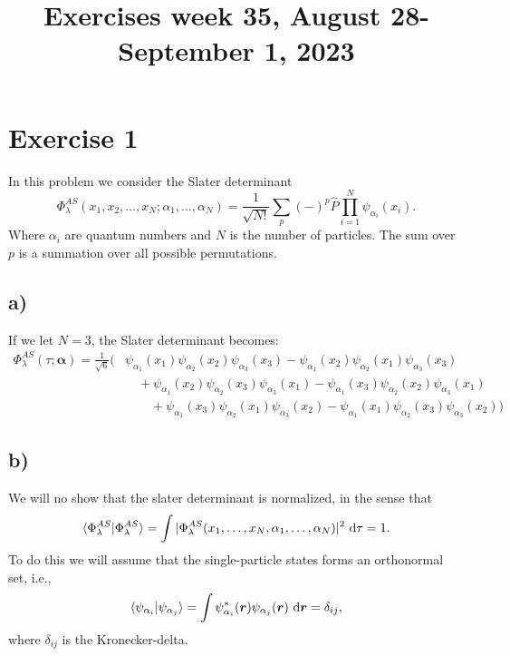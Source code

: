 \documentclass[a4paper, 11pt, notitlepage, english]{article}
\title{Exercises week 35, August 28-September 1, 2023}
\newcommand{\braket}[2]{\langle #1 | #2 \rangle}
\newcommand{\op}[1]{\hat{#1}}
\renewcommand{\d}{{\rm d}}
\newcommand{\bt}[1]{\boldsymbol{#1}}
\begin{document}
\maketitle

\section*{Exercise 1}

In this problem we consider the Slater determinant
$$\Phi_\lambda^{AS} (x_1, x_2, \ldots, x_N; \alpha_1, \ldots, \alpha_N) = \frac{1}{\sqrt{N!}}\sum_p (-)^p \op{P} \prod_{i=1}^N \psi_{\alpha_i}(x_i).$$
Where $\alpha_i$ are quantum numbers and $N$ is the number of particles. The sum over $p$ is a summation over all possible permutations.

\subsection*{a)}
If we let $N=3$, the Slater determinant becomes:
\begin{align*}   
\Phi_\lambda^{AS}(\tau;\bt{\alpha}) = \frac{1}{\sqrt{6}} \bigg(
&\psi_{\alpha_1}(x_1) \psi_{\alpha_2} (x_2)\psi_{\alpha_3}(x_3)
- \psi_{\alpha_1}(x_2) \psi_{\alpha_2} (x_1)\psi_{\alpha_3}(x_3) \\
&\quad+ \psi_{\alpha_1}(x_2) \psi_{\alpha_2} (x_3)\psi_{\alpha_3}(x_1)  
- \psi_{\alpha_1}(x_3) \psi_{\alpha_2} (x_2)\psi_{\alpha_3}(x_1) \\
&\qquad+ \psi_{\alpha_1}(x_3) \psi_{\alpha_2} (x_1)\psi_{\alpha_3}(x_2) 
- \psi_{\alpha_1}(x_1) \psi_{\alpha_2} (x_3)\psi_{\alpha_3}(x_2)\bigg)
\end{align*}

\subsection*{b)}
We will no show that the slater determinant is normalized, in the sense that
$$\braket{\Phi_\lambda^{AS}}{\Phi_\lambda^{AS}} = \int |\Phi_\lambda^{AS} (x_1,\ldots, x_N, \alpha_1, \ldots, \alpha_N)|^2 \ \d \tau= 1.$$
To do this we will assume that the single-particle states forms an orthonormal set, i.e.,
$$\braket{\psi_{\alpha_i}}{\psi_{\alpha_j}} = \int \psi^*_{\alpha_i}(\bt{r})\psi_{\alpha_j}(\bt{r}) \ \d \bt{r} = \delta_{ij},$$
where $\delta_{ij}$ is the Kronecker-delta.
\end{document}
